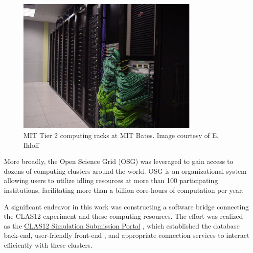     




    \begin{figure}
        \centering
        \includegraphics[width=0.8\textwidth]{Chapters/Ch3-Simulations/overview/pics/Bates_Tier2.jpg}
        \caption[MIT Tier 2]{MIT Tier 2 computing racks at MIT Bates. Image courtesy of E. Ihloff}
        \label{fig:BatesComputing}
    \end{figure}


    





    More broadly, the Open Science Grid (OSG) \parencite{OSG2006OSG} \parencite{Sfiligoi2009TheGlideinWMS} \parencite{Pordes2007TheGrid} was leveraged to gain access to dozens of computing clusters around the world. OSG is an organizational system allowing users to utilize idling resources at more than 100 participating institutions, facilitating more than a billion core-hours of computation per year. 

    A significant endeavor in this work was constructing a software bridge connecting the CLAS12 experiment and these computing resources. The effort was realized as the \href{https://gemc.jlab.org/web_interface/index.php}{CLAS12 Simulation Submission Portal} \parencite{Ungaro2020CLAS12Framework}, which established the database back-end, user-friendly front-end , and appropriate connection services to interact efficiently with these clusters. 
      
